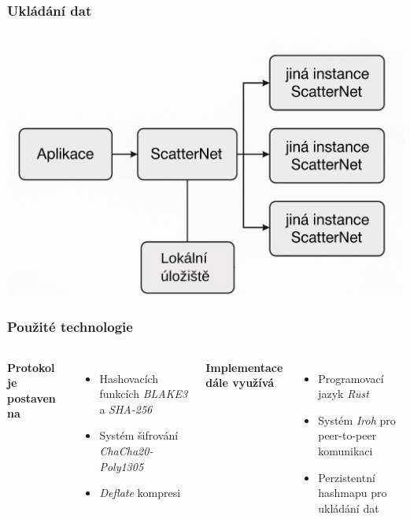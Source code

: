 \begin{frame}
  \frametitle{Ukládání dat}
  \begin{center}
    \includegraphics[width=\textwidth]{img/03-storage.png}
  \end{center}
\end{frame}

\begin{frame}
  \frametitle{Použité technologie}
  \begin{columns}[c]
    \textbf{Protokol je postaven na}
    \begin{itemize}
      \item Hashovacích funkcích \emph{BLAKE3} a \emph{SHA-256}
      \item Systém šifrování \emph{ChaCha20-Poly1305}
      \item \emph{Deflate} kompresi
    \end{itemize}
    \pause
    \textbf{Implementace dále využívá}
    \begin{itemize}
      \item Programovací jazyk \emph{Rust}
      \item Systém \emph{Iroh} pro peer-to-peer komunikaci
      \item Perzistentní hashmapu pro ukládání dat
    \end{itemize}
  \end{columns}
\end{frame}


